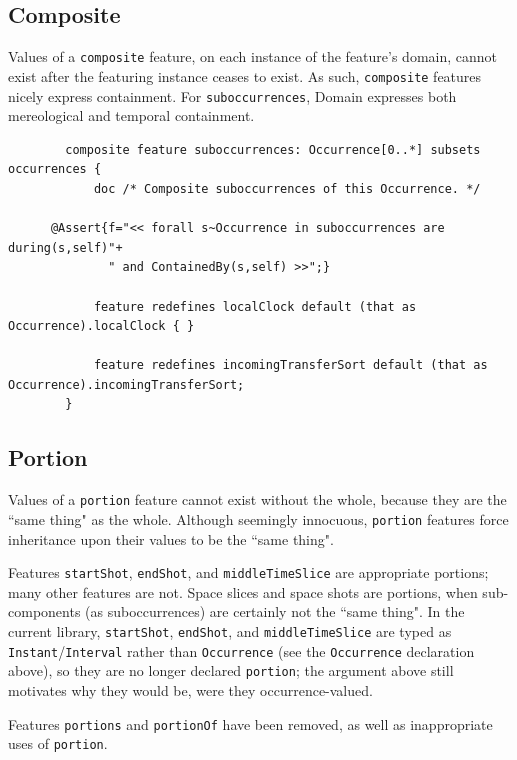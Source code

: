 \subsection{Composite}\label{subsec:composite}

\pn Values of a \texttt{composite} feature, on each instance of the feature's domain, cannot exist after the
featuring instance ceases to exist.  As such, \texttt{composite} features nicely express containment.
For \texttt{suboccurrences}, Domain expresses both mereological and temporal containment.

\begin{lstlisting}
		composite feature suboccurrences: Occurrence[0..*] subsets occurrences {
			doc /* Composite suboccurrences of this Occurrence. */

      @Assert{f="<< forall s~Occurrence in suboccurrences are during(s,self)"+
			  " and ContainedBy(s,self) >>";}

			feature redefines localClock default (that as Occurrence).localClock { }
			 
			feature redefines incomingTransferSort default (that as Occurrence).incomingTransferSort;
		}
\end{lstlisting}

\subsection{Portion}\label{subsec:portion}

\pn Values of a \texttt{portion} feature cannot exist without the whole, because they are the ``same
thing" as the whole.  Although seemingly innocuous, \texttt{portion} features force inheritance upon their values
to be the ``same thing".  

\pn Features \texttt{startShot}, \texttt{endShot}, and \texttt{middleTimeSlice} are appropriate portions; many other features are not.
Space slices and space shots are portions, when sub-components (as suboccurrences) are certainly not the  ``same
thing".  In the current library, \texttt{startShot}, \texttt{endShot}, and \texttt{middleTimeSlice} are typed as \texttt{Instant}/\texttt{Interval} rather than \texttt{Occurrence} (see the \texttt{Occurrence} declaration above), so they are no longer declared \texttt{portion}; the argument above still motivates why they would be, were they occurrence-valued.

\pn Features \texttt{portions} and \texttt{portionOf} have been removed, as well as inappropriate uses of \texttt{portion}. 

